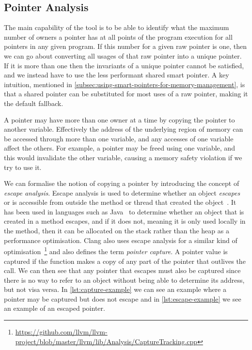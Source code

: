 \documentclass{proposal}
\begin{document}
    \subsection{Pointer Analysis}\label{subsec:pointer-analysis}

    The main capability of the tool is to be able to identify what the maximum number of owners a pointer has at all points of the program execution for all pointers in any given program.
    If this number for a given raw pointer is one, then we can go about converting all usages of that raw pointer into a unique pointer.
    If it is more than one then the invariants of a unique pointer cannot be satisfied, and we instead have to use the less performant shared smart pointer.
    A key intuition, mentioned in \autoref{subsec:using-smart-pointers-for-memory-management}, is that a shared pointer can be substituted for most uses of a raw pointer, making it the default fallback.

    A pointer may have more than one owner at a time by copying the pointer to another variable.
    Effectively the address of the underlying region of memory can be accessed through more than one variable, and any accesses of one variable affect the others.
    For example, a pointer may be freed using one variable, and this would invalidate the other variable, causing a memory safety violation if we try to use it.

    We can formalise the notion of copying a pointer by introducing the concept of \emph{escape analysis}.
    Escape analysis is used to determine whether an object \emph{escapes} or is accessible from outside the method or thread that created the object~\cite{Choi1999}.
    It has been used in languages such as Java~\cite{Choi1999} to determine whether an object that is created in a method escapes, and if it does not, meaning it is only used locally in the method, then it can be allocated on the stack rather than the heap as a performance optimisation.
    Clang also uses escape analysis for a similar kind of optimisation~\footnote{\url{https://github.com/llvm/llvm-project/blob/master/llvm/lib/Analysis/CaptureTracking.cpp}} and also defines the term \emph{pointer capture}.
    A pointer value is captured if the function makes a copy of any part of the pointer that outlives the call.
    We can then see that any pointer that escapes must also be captured since there is no way to refer to an object without being able to determine its address, but not visa versa.
    In \autoref{lst:capture-example} we can see an example where a pointer may be captured but does not escape and in \autoref{lst:escape-example} we see an example of an escaped pointer.
\end{document}
